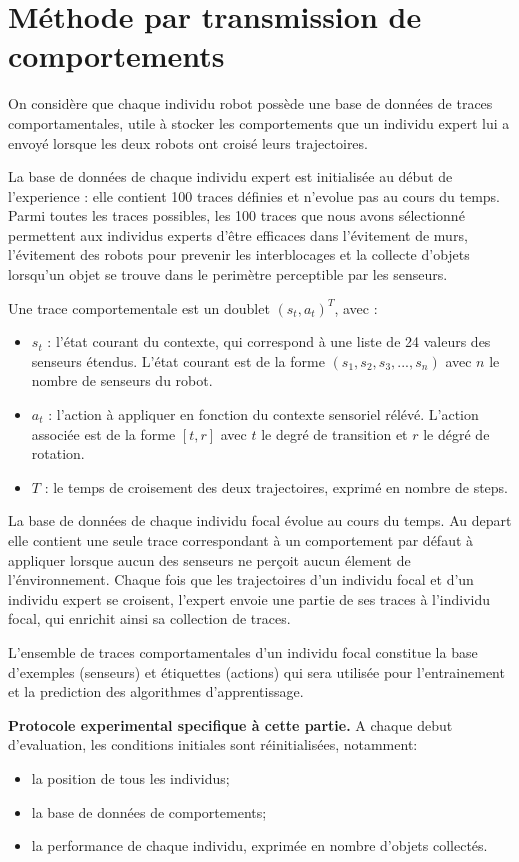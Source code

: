 \documentclass[a4paper, 12pt]{report}
\begin{document}
	\section{Méthode par transmission de comportements}
	On considère que chaque individu robot possède une base de données de traces comportamentales, utile à stocker les comportements que un individu expert lui a envoyé lorsque les deux robots ont croisé leurs trajectoires.
	
	La base de données de chaque individu expert est initialisée au début de l'experience : elle contient 100 traces définies et n'evolue pas au cours du temps. Parmi toutes les traces possibles, les 100 traces que nous avons sélectionné permettent aux individus experts d'être efficaces dans l'évitement de murs, l'évitement des robots pour prevenir les interblocages et la collecte d'objets lorsqu'un objet se trouve dans le perimètre perceptible par les senseurs.
	
	Une trace comportementale est un doublet $( s_t, a_t )^T$, avec :
	\begin{itemize}
	\item $s_t$ : l'état courant du contexte, qui correspond à une liste de 24 valeurs des senseurs étendus. L'état courant est de la forme 
    $(s_1, s_2, s_3, ..., s_n)$ avec $n$ le nombre de senseurs du robot. 
	\item $a_t$ : l'action à appliquer en fonction du contexte sensoriel rélévé. L'action associée est de la forme $[t,r]$ avec $t$ le degré de transition et $r$ le dégré de rotation.
	\item $T$ : le temps de croisement des deux trajectoires, exprimé en nombre de steps. 
	\end{itemize}


	La base de données de chaque individu focal évolue au cours du temps. Au depart elle contient une seule trace correspondant à un comportement par défaut à appliquer lorsque aucun des senseurs ne perçoit aucun élement de l'énvironnement. Chaque fois que les trajectoires d'un individu focal et d'un individu expert se croisent, l'expert envoie une partie de ses traces à l'individu focal, qui enrichit ainsi sa collection de traces.
	
    L'ensemble de traces comportamentales d'un individu focal constitue la base d'exemples (senseurs) et étiquettes (actions) qui sera utilisée pour l'entrainement et la prediction des algorithmes d'apprentissage.
    
    \:
    
    \textbf{Protocole experimental specifique à cette partie.} A chaque debut d'evaluation, les conditions initiales sont réinitialisées, notamment:
    \begin{itemize}
	\item la position de tous les individus;
    \item la base de données de comportements;
    \item la performance de chaque individu, exprimée en nombre d'objets collectés.
	\end{itemize}
    
\end{document}
